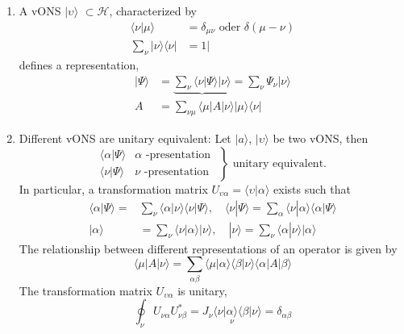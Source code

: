 \begin{enumerate}
    \item A vONS {$|\upsilon\rangle$} $\subset\mathcal{H}$, characterized by
    \begin{equation}
    \begin{aligned}\langle\nu | \mu\rangle &=\delta_{\mu \nu} \text { oder } \delta(\mu-\nu) \\ \sum_{\nu}|\nu\rangle\langle\nu| &=1 | \end{aligned}
    \end{equation}
    defines a representation,
    \begin{equation}
    \begin{aligned}|\Psi\rangle &=\underbrace{\sum_{\nu}\langle\nu | \Psi\rangle|\nu\rangle}=\sum_{\nu} \Psi_{\nu}|\nu\rangle \\ A &=\sum_{\nu \mu}\langle\mu|A| \nu\rangle|\mu\rangle\langle\nu| \end{aligned}
    \end{equation}
    \item Different vONS are unitary equivalent: Let {$| a\rangle$}, {$|\upsilon\rangle$} be two vONS, then
    \begin{equation}
    \left.\begin{array}{ll}{\langle\alpha | \Psi\rangle} & {\alpha \text { -presentation }} \\ {\langle\nu | \Psi\rangle} & {\nu \text { -presentation }}\end{array}\right\} \text { unitary equivalent. }
    \end{equation}
    In particular, a transformation matrix $U_{\upsilon\alpha}=\langle\upsilon|\alpha\rangle$ exists such that
    $$
    \begin{aligned}\langle\alpha | \Psi\rangle=& \sum_{\nu}\langle\alpha | \nu\rangle\langle\nu | \Psi\rangle, \quad\langle\nu | \Psi\rangle=\sum_{\alpha}\langle\nu | \alpha\rangle\langle\alpha | \Psi\rangle \\|\alpha\rangle &=\sum_{\nu}\langle\nu | \alpha\rangle|\nu\rangle, \quad|\nu\rangle=\sum_{\nu}\langle\alpha | \nu\rangle|\alpha\rangle \end{aligned}
    $$
    The relationship between different representations of an operator is given by
    \begin{equation}
        \langle\mu|A| \nu\rangle=\sum_{\alpha \beta}\langle\mu | \alpha\rangle\langle\beta | \nu\rangle\langle\alpha|A| \beta\rangle
        \end{equation}
    The transformation matrix $U_{\upsilon\alpha}$ is unitary,
    \begin{equation}
        \oint_{\nu} U_{\nu \alpha} U_{\nu \beta}^{*}=\underset{\nu}{J_{\nu}\langle\nu | \alpha\rangle\langle\beta | \nu\rangle}=\delta_{\alpha \beta}
        \end{equation}
\end{enumerate}

